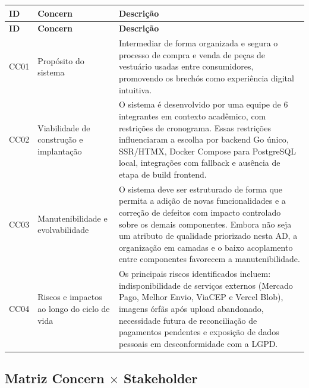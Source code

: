﻿\documentclass[12pt,a4paper]{article}
\begin{document}
\begin{longtable}{|p{1.2cm}|p{4.5cm}|p{8.8cm}|}
\hline
\textbf{ID} & \textbf{Concern} & \textbf{Descrição} \\
\hline
\endfirsthead
\hline
\textbf{ID} & \textbf{Concern} & \textbf{Descrição} \\
\hline
\endhead
CC01 & Propósito do sistema & Intermediar de forma organizada e segura o processo de compra e venda de peças de vestuário usadas entre consumidores, promovendo os brechós como experiência digital intuitiva. \\
\hline
CC02 & Viabilidade de construção e implantação & O sistema é desenvolvido por uma equipe de 6 integrantes em contexto acadêmico, com restrições de cronograma. Essas restrições influenciaram a escolha por backend Go único, SSR/HTMX, Docker Compose para PostgreSQL local, integrações com fallback e ausência de etapa de build frontend. \\
\hline
CC03 & Manutenibilidade e evolvabilidade & O sistema deve ser estruturado de forma que permita a adição de novas funcionalidades e a correção de defeitos com impacto controlado sobre os demais componentes. Embora não seja um atributo de qualidade priorizado nesta AD, a organização em camadas e o baixo acoplamento entre componentes favorecem a manutenibilidade. \\
\hline
CC04 & Riscos e impactos ao longo do ciclo de vida & Os principais riscos identificados incluem: indisponibilidade de serviços externos (Mercado Pago, Melhor Envio, ViaCEP e Vercel Blob), imagens órfãs após upload abandonado, necessidade futura de reconciliação de pagamentos pendentes e exposição de dados pessoais em desconformidade com a LGPD. \\
\hline
\end{longtable}

\subsection{Matriz Concern $\times$ Stakeholder}
\end{document}
